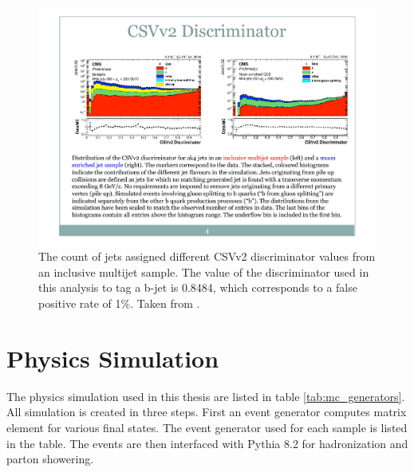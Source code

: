    \begin{figure}[!h]
      \centering
      \includegraphics[width=.8\textwidth]{figures/csv_v2_performance.pdf}
      \caption{The count of jets assigned different CSVv2 discriminator values from an inclusive multijet sample. The value of the discriminator used in this analysis to tag a b-jet is 0.8484, which corresponds to a false positive rate of 1\%. Taken from \cite{csv_v2_performance}.}
      \label{fig:csv_v2_performance}
    \end{figure}

\section{Physics Simulation} \label{sec:monte_carlo}
  The physics simulation used in this thesis are listed in table \ref{tab:mc_generators}. All simulation is created in three steps. First an event generator computes matrix element for various final states. The event generator used for each sample is listed in the table. The events are then interfaced with Pythia 8.2 for hadronization and parton showering. 

